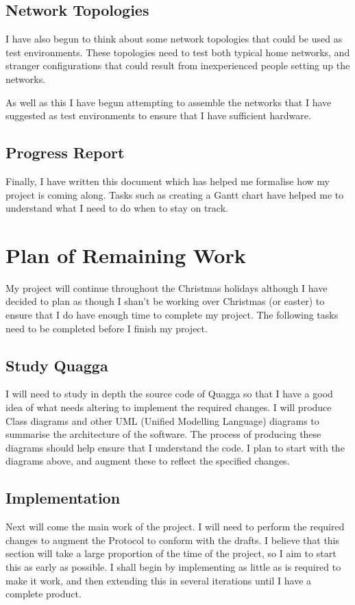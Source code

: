 \documentclass[12pt]{report}
\begin{document}
\section{Network Topologies}
I have also begun to think about some network topologies that could be
used as test environments. These topologies need to test both typical home
networks, and stranger configurations that could result from inexperienced
people setting up the networks. 
 
As well as this I have begun attempting to assemble the networks that I have
suggested as test environments to ensure that I have sufficient hardware. 

\section{Progress Report}
Finally, I have written this document which has helped me formalise how my
project is coming along. Tasks such as creating a Gantt chart have helped me to
understand what I need to do when to stay on track.

\chapter{Plan of Remaining Work}
My project will continue throughout the Christmas holidays although I have
decided to plan as though I shan't be working over Christmas (or easter) to
ensure that I do have enough time to complete my project. The following tasks
need to be completed before I finish my project.

\section{Study Quagga}
I will need to study in depth the source code of Quagga so that I have a
good idea of what needs altering to implement the required changes. I will
produce Class diagrams and other UML (Unified Modelling Language) diagrams to 
summarise the architecture of the software. The process of producing these
diagrams should help ensure that I understand the code. I plan to start with the
diagrams above, and augment these to reflect the specified changes. 

\section{Implementation}
Next will come the main work of the project. I will need to perform the required
changes to augment the Protocol to conform with the drafts. I believe that this
section will take a large proportion of the time of the project, so I aim to
start this as early as possible. I shall begin by implementing as little as
is required to make it work, and then extending this in several iterations until
I have a complete product.
\end{document}

